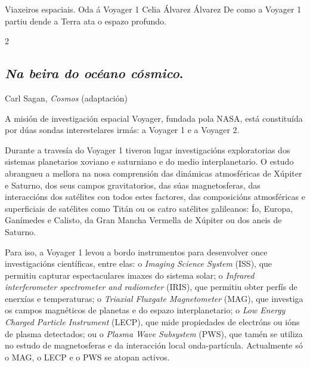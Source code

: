 \Titular*%
{historia}%
{Viaxeiros espaciais. Oda á Voyager 1}%
{Celia Álvarez Álvarez}%
{De como a Voyager 1 partiu dende a Terra ata o espazo profundo.}%

\begin{multicols}{2}

\subsection*{\textit{Na beira do océano cósmico}.}

%
{Carl Sagan, \textit{Cosmos} (adaptación)}

A misión de investigación espacial Voyager, fundada pola NASA, está constituída
por dúas sondas interestelares irmás: a Voyager 1 e a Voyager 2.

Durante a travesía do Voyager 1 tiveron lugar investigacións exploratorias dos
sistemas planetarios xoviano e saturniano e do medio interplanetario. O estudo
abrangueu a mellora na nosa comprensión das dinámicas atmosféricas de Xúpiter e
Saturno, dos seus campos gravitatorios, das súas magnetosferas, das
interaccións dos satélites con todos estes factores, das composicións
atmosféricas e superficiais de satélites como Titán ou os catro satélites
galileanos: Ío, Europa, Ganímedes e Calisto, da Gran Mancha Vermella de Xúpiter
ou dos aneis de Saturno.

Para iso, a Voyager 1 levou a bordo instrumentos para desenvolver once
investigacións científicas, entre elas: o \textit{Imaging Science System}
(ISS), que permitiu capturar espectaculares imaxes do sistema solar; o
\textit{Infrared interferometer spectrometer and radiometer} (IRIS), que
permitiu obter perfís de enerxías e temperaturas; o \textit{Triaxial Fluxgate
Magnetometer} (MAG), que investiga os campos magnéticos de planetas e do espazo
interplanetario; o \textit{Low Energy Charged Particle Instrument} (LECP), que
mide propiedades de electróns ou ións de plasma detectados; ou o \textit{Plasma
Wave Subsystem} (PWS), que tamén se utiliza no estudo de magnetosferas e da
interacción local onda-partícula. Actualmente só o MAG, o LECP e o PWS se
atopan activos.


\end{multicols}
